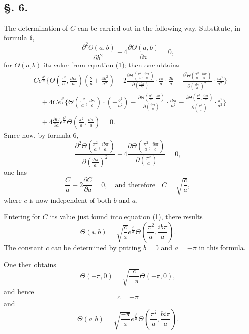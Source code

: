 \documentclass[10pt]{article}
\newcommand{\dd}{\partial}
\newcommand{\sourceanchor}[1]{\hypertarget{source-#1}{}}
\begin{document}
\subsection*{\S. 6.}
The determination of \(C\) can be carried out in the following way. Substitute, in formula 6,
\[
\frac{\dd^{2}\Theta(a,b)}{\dd b^{2}}+4\frac{\dd\Theta(a,b)}{\dd a}=0,
\]
for \(\Theta(a,b)\) its value from equation (1); then one obtains
\begin{align*}
& C e^{\frac{b^{2}}{a}}\Biggl\{\Theta\!\left(\frac{\pi^{2}}{a},\frac{ib\pi}{a}\right)\!\left(\frac{2}{a}+\frac{4b^{2}}{a^{2}}\right)
 +2\frac{\dd\Theta\!\left(\frac{\pi^{2}}{a},\frac{ib\pi}{a}\right)}{\dd\left(\frac{ib\pi}{a}\right)}\cdot\frac{i\pi}{a}\cdot\frac{2b}{a}
 -\frac{\dd^{2}\Theta\!\left(\frac{\pi^{2}}{a},\frac{ib\pi}{a}\right)}{\dd\left(\frac{ib\pi}{a}\right)^{2}}\cdot\frac{4\pi^{2}}{a^{2}}\Biggr\}\\
&\quad +4C e^{\frac{b^{2}}{a}}\Biggl\{\Theta\!\left(\frac{\pi^{2}}{a},\frac{ib\pi}{a}\right)\cdot\left(-\frac{b^{2}}{a^{2}}\right)
-\frac{\dd\Theta\!\left(\frac{\pi^{2}}{a},\frac{ib\pi}{a}\right)}{\dd\left(\frac{ib\pi}{a}\right)}\cdot\frac{ib\pi}{a^{2}}
-\frac{\dd\Theta\!\left(\frac{\pi^{2}}{a},\frac{ib\pi}{a}\right)}{\dd\left(\frac{\pi^{2}}{a}\right)}\cdot\frac{\pi^{2}}{a^{2}}\Biggr\}\\
&\quad +4\frac{\dd C}{\dd a}e^{\frac{b^{2}}{a}}\Theta\!\left(\frac{\pi^{2}}{a},\frac{ib\pi}{a}\right)=0.
\end{align*}
Since now, by formula 6,
\[
\frac{\dd^{2}\Theta\!\left(\frac{\pi^{2}}{a},\frac{ib\pi}{a}\right)}{\dd\left(\frac{ib\pi}{a}\right)^{2}}+4\frac{\dd\Theta\!\left(\frac{\pi^{2}}{a},\frac{ib\pi}{a}\right)}{\dd\left(\frac{\pi^{2}}{a}\right)}=0,
\]
one has
\[
\frac{C}{a}+2\frac{\dd C}{\dd a}=0,
\quad\text{and therefore}\quad
C=\sqrt{\frac{c}{a}},
\]
where \(c\) is now independent of both \(b\) and \(a\).

\sourceanchor{PA07}
Entering for \(C\) its value just found into equation (1), there results
\[
\Theta(a,b)=\sqrt{\frac{c}{a}}e^{\frac{b^{2}}{a}}\Theta\!\left(\frac{\pi^{2}}{a},\frac{ib\pi}{a}\right).
\]
The constant \(c\) can be determined by putting \(b=0\) and \(a=-\pi\) in this formula.

One then obtains
\[
\Theta(-\pi,0)=\sqrt{\frac{c}{-\pi}}\Theta(-\pi,0),
\]
and hence
\[
c=-\pi
\]
and
\begin{equation*}
\Theta(a,b)=\sqrt{\frac{-\pi}{a}}e^{\frac{b^{2}}{a}}\Theta\!\left(\frac{\pi^{2}}{a},\frac{bi\pi}{a}\right).
\tag{7.}
\end{equation*}
\end{document}
